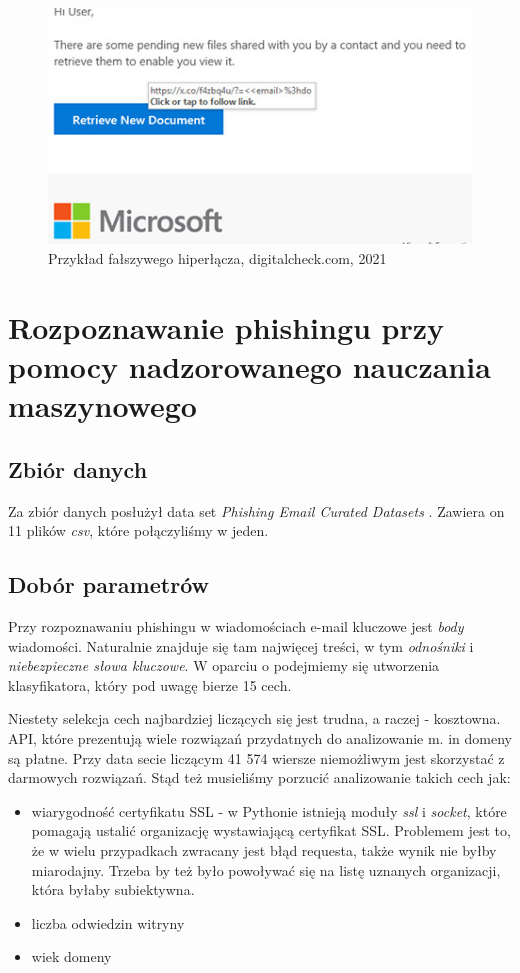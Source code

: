 \documentclass[]{article}
\begin{document}
\begin{figure}[h!]
	\centering
	\includegraphics[width=0.6\linewidth]{Pictures/url_phishing.jpg}
	\caption{Przykład fałszywego hiperłącza, digitalcheck.com, 2021}
	\label{fig:url_phishing}
\end{figure}

\section{Rozpoznawanie phishingu przy pomocy nadzorowanego nauczania maszynowego}
\subsection{Zbiór danych}

Za zbiór danych posłużył data set \textit{Phishing Email Curated Datasets} \cite{zenodo_phishing}. Zawiera on 11 plików \textit{csv}, które połączyliśmy w jeden.
\subsection{Dobór parametrów}


Przy rozpoznawaniu phishingu w wiadomościach e-mail kluczowe jest \textit{body} wiadomości. Naturalnie znajduje się tam najwięcej treści, w tym \textit{odnośniki} i \textit{niebezpieczne słowa kluczowe}. W oparciu o podejmiemy się utworzenia klasyfikatora, który pod uwagę bierze 15 cech.

Niestety selekcja cech najbardziej liczących się jest trudna, a raczej - kosztowna. API, które prezentują wiele rozwiązań przydatnych do analizowanie m. in domeny są płatne. Przy data secie liczącym 41 574 wiersze niemożliwym jest skorzystać z darmowych rozwiązań. Stąd też musieliśmy porzucić analizowanie takich cech jak:
\begin{itemize}[label=$\rightarrow$]
	\item wiarygodność certyfikatu SSL - w Pythonie istnieją moduły \textit{ssl} i \textit{socket}, które pomagają ustalić organizację wystawiającą certyfikat SSL. Problemem jest to, że w wielu przypadkach zwracany jest błąd requesta, także wynik nie byłby miarodajny. Trzeba by też było powoływać się na listę uznanych organizacji, która byłaby subiektywna.
	\item liczba odwiedzin witryny
	\item wiek domeny
\end{itemize}
\end{document}
